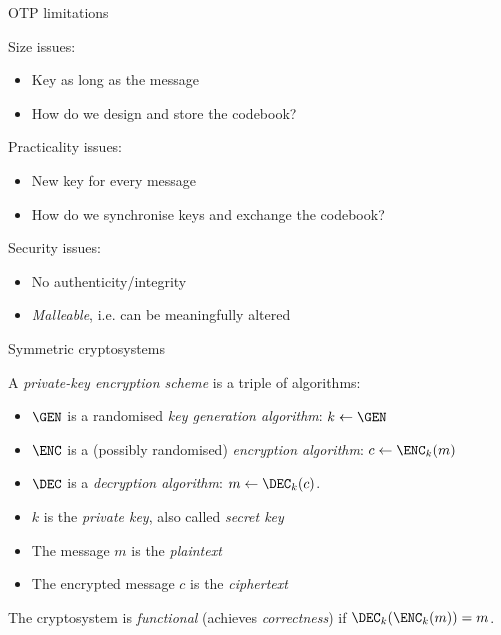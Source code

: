 \begin{frame}{OTP limitations}

  \pause
  Size issues:
  \pause
  \begin{itemize}
    \item Key as long as the message
    \item How do we design and store the codebook?
  \end{itemize}

  \pause
  Practicality issues:
  \pause
  \begin{itemize}
    \item New key for every message
    \item How do we synchronise keys and exchange the codebook?
  \end{itemize}

  \pause
  Security issues:
  \pause
  \begin{itemize}
    \item No authenticity/integrity
    \item \emph{Malleable}, i.e. can be meaningfully altered
  \end{itemize}
\end{frame}

\begin{frame}{Symmetric cryptosystems}

  A \emph{private-key encryption scheme} is a triple of algorithms:
  \begin{itemize}
    \pause\item $\GEN$ is a randomised \emph{key generation algorithm}: $k\gets\GEN$
    \pause\item $\ENC$ is a (possibly randomised) \emph{encryption algorithm}: $c\gets\ENC_k(m)$
    \pause\item $\DEC$ is a \emph{decryption algorithm}: $m\gets\DEC_k(c)$.
  \end{itemize}

  \vspace*{1em}

  \begin{itemize}
    \pause\item $k$ is the \emph{private key}, also called \emph{secret key}
    \pause\item The message $m$ is the \emph{plaintext}
    \pause\item The encrypted message $c$ is the \emph{ciphertext}
  \end{itemize}

  \vspace*{1em}

  \pause
  The cryptosystem is \emph{functional} (achieves \emph{correctness}) if $\DEC_k(\ENC_k(m))=m$.
\end{frame}

